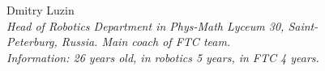 \begin{figure}[H]
	
	\begin{minipage}[h]{0.47\linewidth}
		Dmitry Luzin \\
		\emph{Head of Robotics Department in Phys-Math Lyceum 30, Saint-Peterburg, Russia. Main coach of FTC team.\\}
		\emph{Information: 26 years old, in robotics 5 years, in FTC 4 years.}
	\end{minipage}
	\hfill
	\begin{minipage}{0.47\linewidth}
		\\
	\end{minipage}
	\vfill
	\begin{minipage}[h]{0.47\linewidth}

\end{minipage}
\end{figure}
